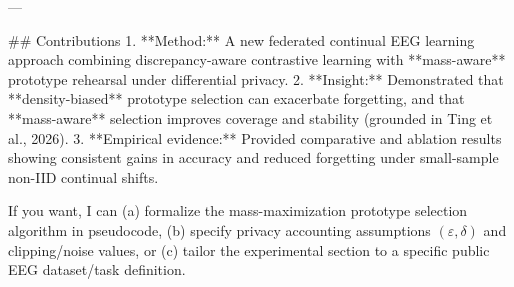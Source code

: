 ---

## Contributions  
1. **Method:** A new federated continual EEG learning approach combining discrepancy-aware contrastive learning with **mass-aware** prototype rehearsal under differential privacy.  
2. **Insight:** Demonstrated that **density-biased** prototype selection can exacerbate forgetting, and that **mass-aware** selection improves coverage and stability (grounded in Ting et al., 2026).  
3. **Empirical evidence:** Provided comparative and ablation results showing consistent gains in accuracy and reduced forgetting under small-sample non-IID continual shifts.  

If you want, I can (a) formalize the mass-maximization prototype selection algorithm in pseudocode, (b) specify privacy accounting assumptions \((\varepsilon,\delta)\) and clipping/noise values, or (c) tailor the experimental section to a specific public EEG dataset/task definition.